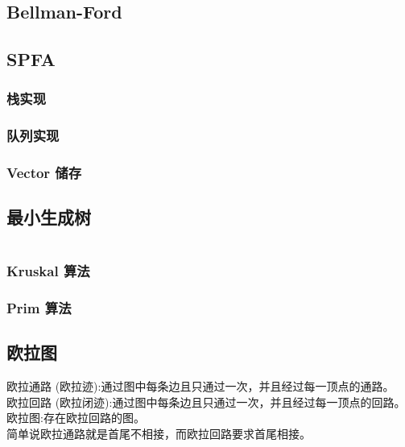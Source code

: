 \documentclass[a4paper]{article}
\begin{document}
\begin{CJK*}{UTF8}{gbsn}
\begin{multicols}{3}
\begin{flushleft}
\subsection{Bellman-Ford}


\subsection{SPFA}


\subsubsection{栈实现}


\subsubsection{队列实现}


\subsubsection{Vector 储存}


\subsection{最小生成树}
\begin{lstlisting}
\end{lstlisting}

\subsubsection{Kruskal 算法}


\subsubsection{Prim 算法}


\subsection{欧拉图}
欧拉通路 (欧拉迹):通过图中每条边且只通过一次，并且经过每一顶点的通路。\\
欧拉回路 (欧拉闭迹):通过图中每条边且只通过一次，并且经过每一顶点的回路。\\
欧拉图:存在欧拉回路的图。\\
简单说欧拉通路就是首尾不相接，而欧拉回路要求首尾相接。\\


\end{flushleft}
\end{multicols}
\end{CJK*}
\end{document}
